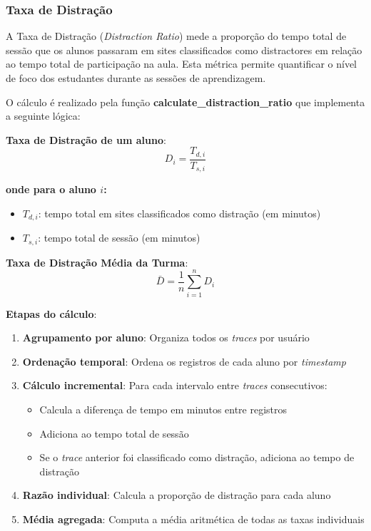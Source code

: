 \subsubsection{Taxa de Distração}
A Taxa de Distração (\textit{Distraction Ratio}) mede a proporção do tempo total de sessão que os alunos passaram em sites classificados como distractores em relação ao tempo total de participação na aula. Esta métrica permite quantificar o nível de foco dos estudantes durante as sessões de aprendizagem.

O cálculo é realizado pela função \textbf{calculate\_distraction\_ratio} que implementa a seguinte lógica:

\textbf{Taxa de Distração de um aluno}:
\begin{equation}
D_i = \frac{T_{d,i}}{T_{s,i}}
\end{equation}

\textbf{onde para o aluno $i$:}
\begin{itemize}
    \item $T_{d,i}$: tempo total em sites classificados como distração (em minutos)
    \item $T_{s,i}$: tempo total de sessão (em minutos)
\end{itemize}

\textbf{Taxa de Distração Média da Turma}:
\begin{equation}
\bar{D} = \frac{1}{n} \sum_{i=1}^{n} D_i
\end{equation}

% 


\textbf{Etapas do cálculo}:
\begin{enumerate}
    \item \textbf{Agrupamento por aluno}: Organiza todos os \textit{traces} por usuário
    \item \textbf{Ordenação temporal}: Ordena os registros de cada aluno por \textit{timestamp}
    \item \textbf{Cálculo incremental}: Para cada intervalo entre \textit{traces} consecutivos:
    \begin{itemize}
        \item Calcula a diferença de tempo em minutos entre registros
        \item Adiciona ao tempo total de sessão
        \item Se o \textit{trace} anterior foi classificado como distração, adiciona ao tempo de distração
    \end{itemize}
    \item \textbf{Razão individual}: Calcula a proporção de distração para cada aluno
    \item \textbf{Média agregada}: Computa a média aritmética de todas as taxas individuais
\end{enumerate}

